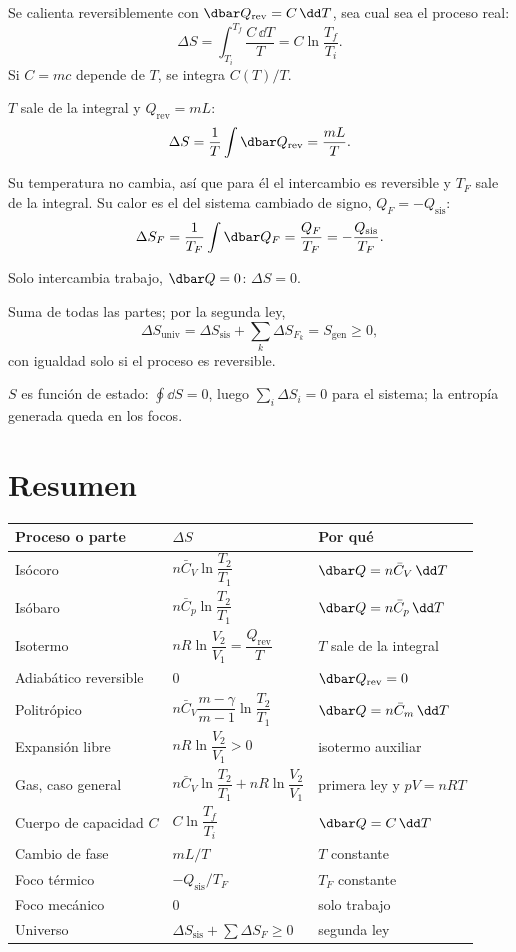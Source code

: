 \documentclass[11pt,a4paper]{article}
\newcommand{\Cv}{\bar C_V}
\newcommand{\Cp}{\bar C_p}
\begin{document}
Se calienta reversiblemente con $\dbar Q_{\mathrm{rev}}=C\,\dd T$, sea cual sea el proceso real:
\[
  \Delta S=\int_{T_i}^{T_f}\frac{C\,\dd T}{T}=C\ln\frac{T_f}{T_i}.
\]
Si $C=mc$ depende de $T$, se integra $C(T)/T$.

$T$ sale de la integral y $Q_{\mathrm{rev}}=mL$:
\[
  \Delta S=\frac1T\int\dbar Q_{\mathrm{rev}}=\frac{mL}{T}.
\]

Su temperatura no cambia, así que para él el intercambio es reversible y $T_F$ sale de la integral. Su calor es
el del sistema cambiado de signo, $Q_F=-Q_{\mathrm{sis}}$:
\[
  \Delta S_F=\frac{1}{T_F}\int\dbar Q_F=\frac{Q_F}{T_F}=-\frac{Q_{\mathrm{sis}}}{T_F}.
\]

Solo intercambia trabajo, $\dbar Q=0$: $\Delta S=0$.

Suma de todas las partes; por la segunda ley,
\[
  \Delta S_{\mathrm{univ}}=\Delta S_{\mathrm{sis}}+\sum_k\Delta S_{F_k}=S_{\mathrm{gen}}\ge0,
\]
con igualdad solo si el proceso es reversible.

$S$ es función de estado: $\oint\dd S=0$, luego $\sum_i\Delta S_i=0$ para el sistema; la entropía generada
queda en los focos.

\section{Resumen}

\begin{center}
\small
\renewcommand{\arraystretch}{1.75}
\begin{tabular}{lll}
\toprule
Proceso o parte & $\Delta S$ & Por qué \\
\midrule
Isócoro & $n\Cv\ln\dfrac{T_2}{T_1}$ & $\dbar Q=n\Cv\,\dd T$\\
Isóbaro & $n\Cp\ln\dfrac{T_2}{T_1}$ & $\dbar Q=n\Cp\,\dd T$\\
Isotermo & $nR\ln\dfrac{V_2}{V_1}=\dfrac{Q_{\mathrm{rev}}}{T}$ & $T$ sale de la integral\\
Adiabático reversible & $0$ & $\dbar Q_{\mathrm{rev}}=0$\\
Politrópico & $n\Cv\dfrac{m-\gamma}{m-1}\ln\dfrac{T_2}{T_1}$ & $\dbar Q=n\bar C_m\,\dd T$\\
Expansión libre & $nR\ln\dfrac{V_2}{V_1}>0$ & isotermo auxiliar\\
Gas, caso general & $n\Cv\ln\dfrac{T_2}{T_1}+nR\ln\dfrac{V_2}{V_1}$ & primera ley y $pV=nRT$\\
Cuerpo de capacidad $C$ & $C\ln\dfrac{T_f}{T_i}$ & $\dbar Q=C\,\dd T$\\
Cambio de fase & $mL/T$ & $T$ constante\\
Foco térmico & $-Q_{\mathrm{sis}}/T_F$ & $T_F$ constante\\
Foco mecánico & $0$ & solo trabajo\\
Universo & $\Delta S_{\mathrm{sis}}+\sum\Delta S_F\ge0$ & segunda ley\\
\bottomrule
\end{tabular}
\end{center}
\end{document}
